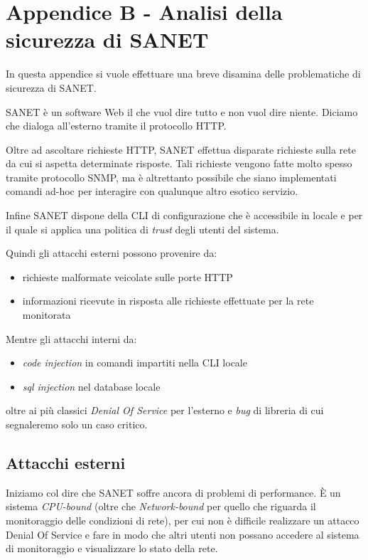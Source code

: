 \documentclass[a4wide,10pt,italian]{manual}
\begin{document}
\chapter{Appendice B - Analisi della sicurezza di SANET}

In questa appendice si vuole effettuare una breve disamina delle problematiche di sicurezza di SANET.

SANET è un software Web il che vuol dire tutto e non vuol dire niente.
Diciamo che dialoga all'esterno tramite il protocollo HTTP.

Oltre ad ascoltare richieste HTTP, SANET effettua disparate richieste sulla rete da cui si aspetta
determinate risposte. Tali richieste vengono fatte molto spesso tramite protocollo SNMP,
ma è altrettanto possibile che siano implementati comandi ad-hoc per interagire con qualunque altro esotico servizio.

Infine SANET dispone della CLI di configurazione che è accessibile in locale
e per il quale si applica una politica di \emph{trust} degli utenti del sistema.

Quindi gli attacchi esterni possono provenire da:
\begin{itemize}
\item {} 
richieste malformate veicolate sulle porte HTTP

\item {} 
informazioni ricevute in risposta alle richieste effettuate per la rete monitorata

\end{itemize}

Mentre gli attacchi interni da:
\begin{itemize}
\item {} 
\emph{code injection} in comandi impartiti nella CLI locale

\item {} 
\emph{sql injection} nel database locale

\end{itemize}

oltre ai più classici \emph{Denial Of Service} per l'esterno e \emph{bug} di libreria di cui segnaleremo solo un caso critico.


\section{Attacchi esterni}

Iniziamo col dire che SANET soffre ancora di problemi di performance. È un sistema \emph{CPU-bound}
(oltre che \emph{Network-bound} per quello che riguarda il monitoraggio delle condizioni di rete), per cui non è difficile realizzare un attacco
Denial Of Service e fare in modo che altri utenti non possano accedere al sistema di monitoraggio e visualizzare
lo stato della rete.
\end{document}
